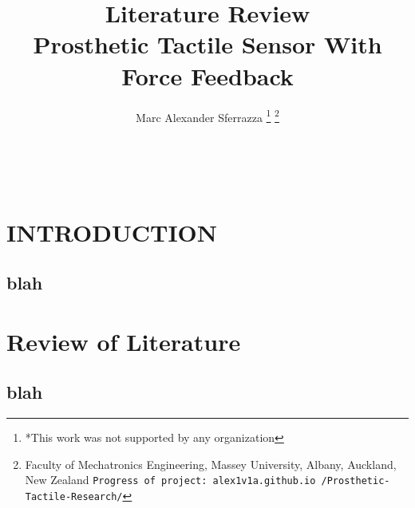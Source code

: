 \documentclass[a4paper, 10pt, conference]{IEEEconf}
\title{\LARGE \bf
Literature Review\\Prosthetic Tactile Sensor With Force Feedback
}
\author{Marc Alexander Sferrazza%
\thanks{*This work was not supported by any organization}%
\thanks{Faculty of Mechatronics Engineering, Massey University, Albany, Auckland, New Zealand
        {\tt\small Progress of project: alex1v1a.github.io /Prosthetic-Tactile-Research/}}%
}
\begin{document}
\begin{figure}
	\centering
	
\end{figure}

\

\maketitle
\thispagestyle{empty}
\pagestyle{empty}


\begin{abstract}



\end{abstract}


\section{INTRODUCTION}

\subsection{blah}

\begin{comment}
?	A concise definition of a topic under consideration (this may be a descriptive or agumentative thesis, or proposal), as well as the scope of the related literature being investigated. (Example: If the topic under consideration is `women's wartime diaries', the scope of the review may be limited to published or unpublished works, works in English, works from a particular location, time period, or conflict, etc.)
?	The introduction should also note intentional exclusions. (Example: "This review will not explore the diaries of adolescent girls.")
?	Another purpose of the introduction is to state the general findings of the review (what do most of the sources conclude), and comment on the availability of sources in the subject area.

Introductory section
o Explain why the review is carried out
o Describe the scope of the review
o Explain how the information in the
\end{comment}

\clearpage
\section{Review of Literature}

\subsection{blah}
\end{document}
